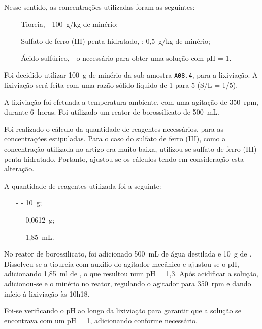 Nesse sentido, as concentrações utilizadas foram as seguintes:
\begin{itemize}
    \item[-] Tioreia, \tioureia{} - 100~g/kg de minério;
    \item[-] Sulfato de ferro (III) penta-hidratado, \sulfe{}: 0,5~g/kg de minério;
    \item[-] Ácido sulfúrico, \acsul{} - o necessário para obter uma solução com pH = 1.
\end{itemize}

Foi decidido utilizar 100~g de minério da sub-amostra \texttt{A08.4}, para a lixiviação. 
A lixiviação será feita com uma razão sólido líquido de 1 para 5 (S/L = 1/5).

A lixiviação foi efetuada a temperatura ambiente, com uma agitação de 350~rpm, durante 6~horas.
Foi utilizado um reator de borossilicato de 500~mL.

Foi realizado o cálculo da quantidade de reagentes necessários, para as concentrações estipuladas. 
Para o caso do sulfato de ferro (III), como a concentração utilizada no artigo era muito baixa, utilizou-se sulfato de ferro (III) penta-hidratado. Portanto, ajustou-se os cálculos tendo em consideração esta alteração.

A quantidade de reagentes utilizada foi a seguinte:
\begin{itemize}
    \item[-] \tioureia{} - 10~g;
    \item[-] \sulfe{} - 0,0612~g;
    \item[-] \acsul{} - 1,85~mL.
\end{itemize}

No reator de borossilicato, foi adicionado 500~mL de água destilada e 10~g de \tioureia{}   .
Dissolveu-se a tioureia com auxílio do agitador mecânico e ajustou-se o pH, adicionando 1,85~ml de \acsul{}, o que resultou num pH = 1,3.
Após acidificar a solução, adicionou-se \sulfe{} e o minério no reator, regulando o agitador para 350~rpm e dando início à lixiviação às 10h18.

Foi-se verificando o pH ao longo da lixiviação para garantir que a solução se encontrava com um pH = 1, adicionando \acsul{} conforme necessário.

